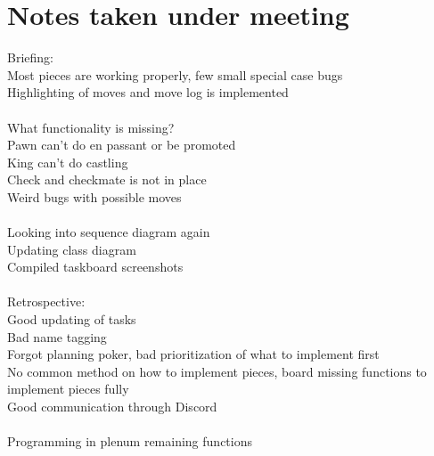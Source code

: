\documentclass[letterpaper,11pt]{article}
\begin{document}
\section*{Notes taken under meeting}
Briefing: \\
Most pieces are working properly, few small special case bugs \\
Highlighting of moves and move log is implemented \\\\
What functionality is missing? \\
Pawn can't do en passant or be promoted \\
King can't do castling \\
Check and checkmate is not in place \\
Weird bugs with possible moves \\\\
Looking into sequence diagram again \\
Updating class diagram \\
Compiled taskboard screenshots \\\\
Retrospective:\\
Good updating of tasks \\
Bad name tagging \\
Forgot planning poker, bad prioritization of what to implement first \\
No common method on how to implement pieces, board missing functions to implement pieces fully \\
Good communication through Discord \\\\
Programming in plenum remaining functions \\
\end{document}
